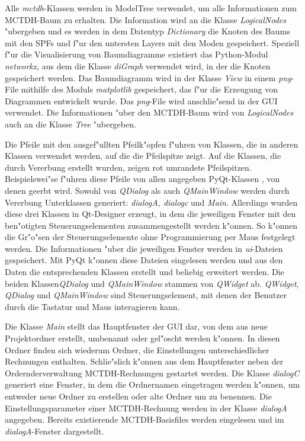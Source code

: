 Alle \textit{mctdh}-Klassen werden in ModelTree verwendet, um alle Informationen zum MCTDH-Baum zu erhalten. Die Information wird an die
Klasse \textit{LogicalNodes} "ubergeben und es werden in dem Datentyp \textit{Dictionary} die Knoten des Baums mit den SPFs und f"ur den 
untersten Layers mit den Moden gespeichert. Speziell f"ur die Visualisierung von Baumdiagramme existiert das Python-Modul \textit{networkx}, 
aus dem die Klasse \textit{diGraph} verwendet wird, in der die Knoten gespeichert werden. Das Baumdiagramm wird in der Klasse \textit{View}
in einem \textit{png}-File mithilfe des Moduls \textit{matplotlib} gespeichert, das f"ur die Erzeugung von Diagrammen entwickelt wurde.
Das \textit{png}-File wird anschlie"send in der GUI verwendet. Die Informationen "uber den MCTDH-Baum wird von \textit{LogicalNodes}
auch an die Klasse \textit{Tree} "ubergeben.

Die Pfeile mit den ausgef"ullten Pfeilk"opfen  f"uhren von Klassen, die in anderen Klassen verwendet werden,
auf die die Pfeilspitze zeigt. 
Auf die Klassen, die durch Vererbung erstellt wurden, zeigen rot umrandete Pfeilspitzen. Beispielswei"se f"uhren diese Pfeile von allen angegeben PyQt-Klassen
, von denen geerbt wird.
Sowohl von \textit{QDialog} als auch \textit{QMainWindow} werden durch Vererbung Unterklassen generiert: \textit{dialogA, dialogc} und \textit{Main}. 
Allerdings wurden diese drei Klassen in Qt-Designer erzeugt, in dem die jeweiligen Fenster mit den ben"otigten Steuerungselementen zusammengestellt werden 
k"onnen. So k"onnen die Gr"o"sen der Steuerungselemente ohne Programmierung per Maus festgelegt werden. Die Informationen "uber 
die jeweiligen Fenster werden in \textit{ui}-Dateien gespeichert. Mit PyQt k"onnen diese Dateien eingelesen werden und aus den Daten die entsprechenden 
Klassen erstellt und beliebig erweitert werden.
Die beiden Klassen\textit{QDialog} und \textit{QMainWindow} stammen von \textit{QWidget} ab. \textit{QWidget}, \textit{QDialog} und \textit{QMainWindow}
sind Steuerungselement, mit denen der Benutzer durch die Tastatur und Maus interagieren kann. \cite{PyQt}

Die Klasse \textit{Main} stellt das Hauptfenster der GUI dar, von dem aus neue Projektordner erstellt, umbenannt oder gel"oscht werden k"onnen.
In diesen Ordner finden sich wiederum Ordner, die Einstellungen unterschiedlicher Rechnungen enthalten. Schlie"slich k"onnen aus
dem Hauptfenster neben der Ordernderverwaltung MCT\-DH-Rechnungen gestartet werden.
Die Klasse \textit{dialogC} generiert eine Fenster, in dem die Ordnernamen eingetragen werden k"onnen, um entweder neue Ordner zu erstellen
oder alte Ordner um zu benennen.
Die Einstellungsparameter einer MCTDH-Rechnung werden in der Klasse \textit{dialogA} angegeben. Bereits existierende MCTDH-Basisfiles werden
eingelesen und im \textit{dialogA}-Fenster dargestellt.


